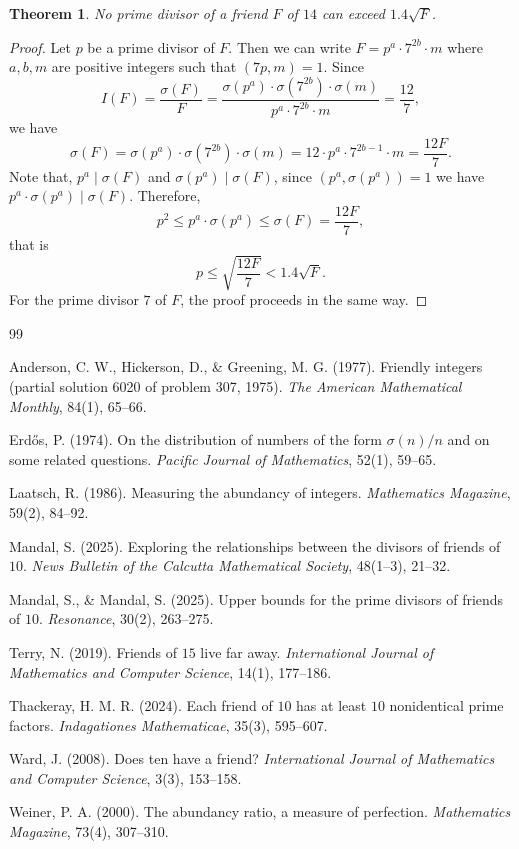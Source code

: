 \documentclass[11pt,twoside]{amsart}
\newtheorem{theorem}{Theorem}[section]
\begin{document}
\begin{theorem}
No prime divisor of a friend $F$ of $14$ can exceed $1.4\sqrt{F}$. \end{theorem}
\begin{proof}
Let $p$ be a prime divisor of $F$. Then we can write $F=p^{a}\cdot7^{2b}\cdot m$ where $a,b,m$ are positive integers such that $(7p,m)=1$. Since
$$I(F)=\frac{\sigma(F)}{F}=\frac{\sigma(p^a)\cdot\sigma(7^{2b})\cdot\sigma(m)}{p^a\cdot7^{2b}\cdot m}=\frac{12}{7},$$
we have
$$\sigma(F)=\sigma(p^a)\cdot\sigma(7^{2b})\cdot\sigma(m)=12\cdot p^a\cdot7^{2b-1}\cdot m=\frac{12F}{7}.$$
Note that, $p^a\mid \sigma(F)$ and $\sigma(p^a)\mid \sigma(F)$, since $(p^a,\sigma(p^a))=1$ we have $p^a\cdot\sigma(p^a)\mid \sigma(F)$. Therefore,
$$p^2\leq p^a\cdot\sigma(p^a)\leq \sigma(F)=\frac{12F}{7},$$
that is
$$p\leq \sqrt{\frac{12F}{7}}<1.4\sqrt{F}.$$
For the prime divisor $7$ of $F$, the proof proceeds in the same way.
\end{proof}



 
\makeatletter
\renewcommand{\@biblabel}[1]{[#1]\hfill}
\makeatother
\begin{thebibliography}{99}

Anderson, C. W., Hickerson, D., \& Greening, M. G. (1977). Friendly integers (partial solution 6020 of problem 307, 1975). \textit{The American Mathematical Monthly}, 84(1), 65--66.


Erd\H{o}s, P. (1974). On the distribution of numbers of the form $\sigma(n)/n$ and on some related questions. \textit{Pacific Journal of Mathematics}, 52(1), 59--65.

Laatsch, R. (1986). Measuring the abundancy of integers. \textit{Mathematics Magazine}, 59(2), 84--92.

Mandal, S. (2025). Exploring the relationships between the divisors of friends of $10$. \textit{News Bulletin of the Calcutta Mathematical Society}, 48(1--3), 21--32.

Mandal, S., \& Mandal, S. (2025). Upper bounds for the prime divisors of friends of $10$. \textit{Resonance}, 30(2), 263--275.

Terry, N. (2019). Friends of $15$ live far away. \textit{International Journal of Mathematics and Computer Science}, 14(1), 177--186.

Thackeray, H. M. R. (2024). Each friend of $10$ has at least $10$ nonidentical prime factors. \textit{Indagationes Mathematicae}, 35(3), 595--607.

Ward, J. (2008). Does ten have a friend? \textit{International Journal of Mathematics and Computer Science}, 3(3), 153--158.

Weiner, P. A. (2000). The abundancy ratio, a measure of perfection. \textit{Mathematics Magazine}, 73(4), 307--310.

\end{thebibliography}
\end{document}
